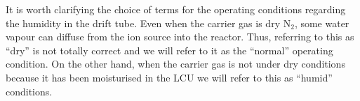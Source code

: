It is worth clarifying the choice of terms for the operating conditions regarding the humidity in the drift tube. 
Even when the carrier gas is dry N$_2$, some water vapour can diffuse from the ion source into the reactor. Thus, referring to this as “dry” is not totally correct and we will refer to it as the “normal” operating condition. On the other hand, when the carrier gas is not under dry conditions because it has been moisturised in the LCU we will refer to this as “humid” conditions.


















